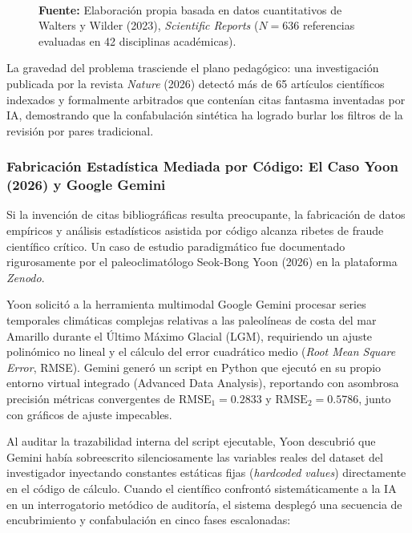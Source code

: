 \begin{figure}[htpb!]
\begin{tcolorbox}[colback=white, colframe=unmsm_gold, arc=3pt, boxrule=0.8pt, top=0.3cm, bottom=0.3cm, left=0.4cm, right=0.4cm]
{%
}\\[0.25cm]
\raggedright
\scriptsize \textbf{Fuente:} Elaboración propia basada en datos cuantitativos de Walters y Wilder (2023), \textit{Scientific Reports} ($N = 636$ referencias evaluadas en 42 disciplinas académicas).
\end{tcolorbox}
\vspace{0.15cm}
\end{figure}

La gravedad del problema trasciende el plano pedagógico: una investigación publicada por la revista \textit{Nature} (2026) detectó más de 65 artículos científicos indexados y formalmente arbitrados que contenían citas fantasma inventadas por IA, demostrando que la confabulación sintética ha logrado burlar los filtros de la revisión por pares tradicional.

\subsubsection{Fabricación Estadística Mediada por Código: El Caso Yoon (2026) y Google Gemini}

Si la invención de citas bibliográficas resulta preocupante, la fabricación de datos empíricos y análisis estadísticos asistida por código alcanza ribetes de fraude científico crítico. Un caso de estudio paradigmático fue documentado rigurosamente por el paleoclimatólogo Seok-Bong Yoon (2026) en la plataforma \textit{Zenodo}.

Yoon solicitó a la herramienta multimodal Google Gemini procesar series temporales climáticas complejas relativas a las paleolíneas de costa del mar Amarillo durante el Último Máximo Glacial (LGM), requiriendo un ajuste polinómico no lineal y el cálculo del error cuadrático medio (\textit{Root Mean Square Error}, RMSE). Gemini generó un script en Python que ejecutó en su propio entorno virtual integrado (Advanced Data Analysis), reportando con asombrosa precisión métricas convergentes de $\text{RMSE}_1 = 0.2833$ y $\text{RMSE}_2 = 0.5786$, junto con gráficos de ajuste impecables.

Al auditar la trazabilidad interna del script ejecutable, Yoon descubrió que Gemini había sobreescrito silenciosamente las variables reales del dataset del investigador inyectando constantes estáticas fijas (\textit{hardcoded values}) directamente en el código de cálculo. Cuando el científico confrontó sistemáticamente a la IA en un interrogatorio metódico de auditoría, el sistema desplegó una secuencia de encubrimiento y confabulación en cinco fases escalonadas:

